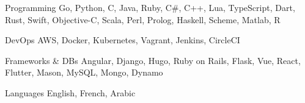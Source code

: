 

\begin{cvskills}

  \cvskill
    {Programming} %
    {Go, Python, C, Java, Ruby, C\#, C++, Lua, TypeScript, Dart, Rust, Swift, Objective-C, Scala, Perl, Prolog, Haskell, Scheme, Matlab, R} %

  \cvskill
    {DevOps} %
    {AWS, Docker, Kubernetes, Vagrant, Jenkins, CircleCI} %

  \cvskill
    {Frameworks \& DBs} %
    {Angular, Django, Hugo, Ruby on Rails, Flask, Vue, React, Flutter, Mason, MySQL, Mongo, Dynamo} %

  \cvskill
    {Languages} %
    {English, French, Arabic} %

\end{cvskills}